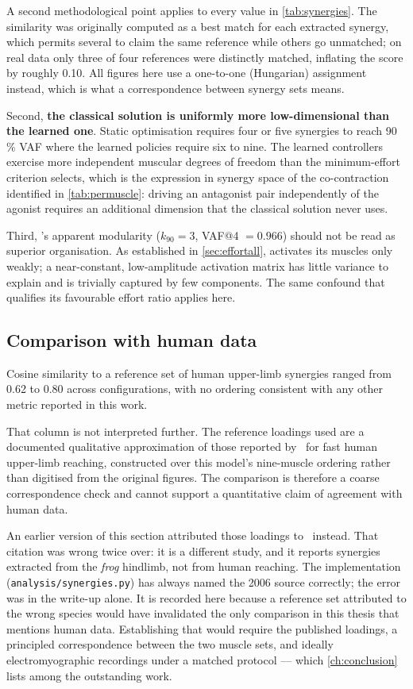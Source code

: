 A second methodological point applies to every value in \cref{tab:synergies}. The
similarity was originally computed as a best match for each extracted synergy,
which permits several to claim the same reference while others go unmatched; on
real data only three of four references were distinctly matched, inflating the
score by roughly 0.10. All figures here use a one-to-one (Hungarian) assignment
instead, which is what a correspondence between synergy sets means.

Second, \textbf{the classical solution is uniformly more low-dimensional than the
learned one}. Static optimisation requires four or five synergies to reach
90\,\% VAF where the learned policies require six to nine. The learned
controllers exercise more independent muscular degrees of freedom than the
minimum-effort criterion selects, which is the expression in synergy space of the
co-contraction identified in \cref{tab:permuscle}: driving an antagonist pair
independently of the agonist requires an additional dimension that the classical
solution never uses.

Third, \PPO's apparent modularity ($k_{90} = 3$, VAF@4 $= 0.966$) should not be
read as superior organisation. As established in \cref{sec:effortall}, \PPO
activates its muscles only weakly; a near-constant, low-amplitude activation
matrix has little variance to explain and is trivially captured by few
components. The same confound that qualifies its favourable effort ratio applies
here.

\subsection{Comparison with human data}

Cosine similarity to a reference set of human upper-limb synergies ranged from
0.62 to 0.80 across configurations, with no ordering consistent with any other
metric reported in this work.

That column is not interpreted further. The reference loadings used are a
documented qualitative approximation of those reported
by~\textcite{dAvella2006} for fast human upper-limb reaching, constructed over
this model's nine-muscle ordering rather than digitised from the original
figures. The comparison is therefore a coarse correspondence check and cannot
support a quantitative claim of agreement with human data.

An earlier version of this section attributed those loadings
to~\textcite{dAvella2003} instead. That citation was wrong twice over: it is a
different study, and it reports synergies extracted from the \emph{frog}
hindlimb, not from human reaching. The implementation
(\texttt{analysis/synergies.py}) has always named the 2006 source correctly; the
error was in the write-up alone. It is recorded here because a reference set
attributed to the wrong species would have invalidated the only comparison in
this thesis that mentions human data. Establishing that would require the published loadings, a
principled correspondence between the two muscle sets, and ideally
electromyographic recordings under a matched protocol --- which
\cref{ch:conclusion} lists among the outstanding work.

